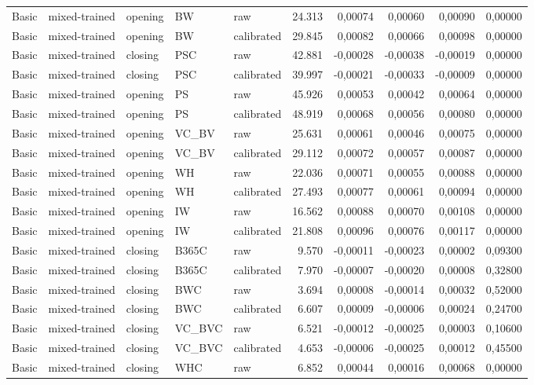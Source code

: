 {\begin{longtable}{@{}lllllrrrrr@{}}
Basic & mixed-trained & opening & BW & raw & 24.313 & 0,00074 & 0,00060 & 0,00090 & 0,00000 \\
Basic & mixed-trained & opening & BW & calibrated & 29.845 & 0,00082 & 0,00066 & 0,00098 & 0,00000 \\
Basic & mixed-trained & closing & PSC & raw & 42.881 & -0,00028 & -0,00038 & -0,00019 & 0,00000 \\
Basic & mixed-trained & closing & PSC & calibrated & 39.997 & -0,00021 & -0,00033 & -0,00009 & 0,00000 \\
Basic & mixed-trained & opening & PS & raw & 45.926 & 0,00053 & 0,00042 & 0,00064 & 0,00000 \\
Basic & mixed-trained & opening & PS & calibrated & 48.919 & 0,00068 & 0,00056 & 0,00080 & 0,00000 \\
Basic & mixed-trained & opening & VC\_BV & raw & 25.631 & 0,00061 & 0,00046 & 0,00075 & 0,00000 \\
Basic & mixed-trained & opening & VC\_BV & calibrated & 29.112 & 0,00072 & 0,00057 & 0,00087 & 0,00000 \\
Basic & mixed-trained & opening & WH & raw & 22.036 & 0,00071 & 0,00055 & 0,00088 & 0,00000 \\
Basic & mixed-trained & opening & WH & calibrated & 27.493 & 0,00077 & 0,00061 & 0,00094 & 0,00000 \\
Basic & mixed-trained & opening & IW & raw & 16.562 & 0,00088 & 0,00070 & 0,00108 & 0,00000 \\
Basic & mixed-trained & opening & IW & calibrated & 21.808 & 0,00096 & 0,00076 & 0,00117 & 0,00000 \\
Basic & mixed-trained & closing & B365C & raw & 9.570 & -0,00011 & -0,00023 & 0,00002 & 0,09300 \\
Basic & mixed-trained & closing & B365C & calibrated & 7.970 & -0,00007 & -0,00020 & 0,00008 & 0,32800 \\
Basic & mixed-trained & closing & BWC & raw & 3.694 & 0,00008 & -0,00014 & 0,00032 & 0,52000 \\
Basic & mixed-trained & closing & BWC & calibrated & 6.607 & 0,00009 & -0,00006 & 0,00024 & 0,24700 \\
Basic & mixed-trained & closing & VC\_BVC & raw & 6.521 & -0,00012 & -0,00025 & 0,00003 & 0,10600 \\
Basic & mixed-trained & closing & VC\_BVC & calibrated & 4.653 & -0,00006 & -0,00025 & 0,00012 & 0,45500 \\
Basic & mixed-trained & closing & WHC & raw & 6.852 & 0,00044 & 0,00016 & 0,00068 & 0,00000 \\

\end{longtable}}
